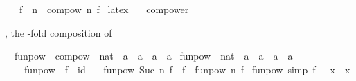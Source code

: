\begin{isabellebody}
\ \ \ {\isachardoublequoteopen}f\ {\isacharcircum}{\kern0pt}{\isacharcircum}{\kern0pt}\ n\ {\isasymequiv}\ compow\ n\ f{\isachardoublequoteclose}\isanewline
\isanewline
{}\isamarkupfalse%
\ {\isacharparenleft}{\kern0pt}latex\ \isanewline
\ \ compower\ {\isacharparenleft}{\kern0pt}{\isachardoublequoteopen}{\isacharparenleft}{\kern0pt}{\isacharunderscore}{\kern0pt}\isactrlbsup {\isacharunderscore}{\kern0pt}\isactrlesup {\isacharparenright}{\kern0pt}{\isachardoublequoteclose}\ {\isacharbrackleft}{\kern0pt}{}{}{}{}{\isacharbrackright}{\kern0pt}\ {}{}{}{}{\isacharparenright}{\kern0pt}%
\begin{isamarkuptext}%
, the -fold composition of %
\end{isamarkuptext}\isamarkuptrue%
\isamarkupfalse%
\isanewline
\ \ funpow\ {\isasymequiv}\ {\isachardoublequoteopen}compow\ {\isacharcolon}{\kern0pt}{\isacharcolon}{\kern0pt}\ nat\ {\isasymRightarrow}\ {\isacharparenleft}{\kern0pt}{\isacharprime}{\kern0pt}a\ {\isasymRightarrow}\ {\isacharprime}{\kern0pt}a{\isacharparenright}{\kern0pt}\ {\isasymRightarrow}\ {\isacharparenleft}{\kern0pt}{\isacharprime}{\kern0pt}a\ {\isasymRightarrow}\ {\isacharprime}{\kern0pt}a{\isacharparenright}{\kern0pt}{\isachardoublequoteclose}\isanewline
{}\isanewline
\isanewline
{}\isamarkupfalse%
\ funpow\ {\isacharcolon}{\kern0pt}{\isacharcolon}{\kern0pt}\ {\isachardoublequoteopen}nat\ {\isasymRightarrow}\ {\isacharparenleft}{\kern0pt}{\isacharprime}{\kern0pt}a\ {\isasymRightarrow}\ {\isacharprime}{\kern0pt}a{\isacharparenright}{\kern0pt}\ {\isasymRightarrow}\ {\isacharprime}{\kern0pt}a\ {\isasymRightarrow}\ {\isacharprime}{\kern0pt}a{\isachardoublequoteclose}\isanewline
\ \ \isanewline
\ \ \ \ {\isachardoublequoteopen}funpow\ {}\ f\ {\isacharequal}{\kern0pt}\ id{\isachardoublequoteclose}\isanewline
\ \ {\isacharbar}{\kern0pt}\ {\isachardoublequoteopen}funpow\ {\isacharparenleft}{\kern0pt}Suc\ n{\isacharparenright}{\kern0pt}\ f\ {\isacharequal}{\kern0pt}\ f\ {\isasymcirc}\ funpow\ n\ f{\isachardoublequoteclose}\isanewline
\isanewline
{}\isamarkupfalse%
\isanewline
\isanewline
{}\isamarkupfalse%
\ funpow{\isacharunderscore}{\kern0pt}{}\ {\isacharbrackleft}{\kern0pt}simp{\isacharbrackright}{\kern0pt}{\isacharcolon}{\kern0pt}\ {\isachardoublequoteopen}{\isacharparenleft}{\kern0pt}f\ {\isacharcircum}{\kern0pt}{\isacharcircum}{\kern0pt}\ {}{\isacharparenright}{\kern0pt}\ x\ {\isacharequal}{\kern0pt}\ x{\isachardoublequoteclose}\isanewline

\end{isabellebody}
